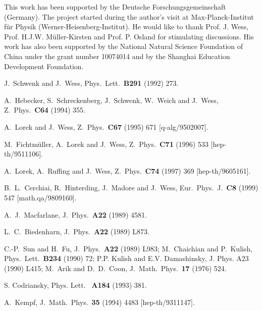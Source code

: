 \documentclass[a4paper,12pt]{article}
\begin{document}
\vspace{0.4cm}
  This work has been supported by the Deutsche Forschungsgemeinschaft 
(Germany). The project started during the author's visit at 
Max-Planck-Institut f\"ur Physik (Werner-Heisenberg-Institut).
 He would like to thank Prof. J. Wess, Prof. H.J.W. M\"uller-Kirsten
 and Prof. P. Osland for stimulating discussions.
 His work has also been supported by the National Natural Science 
Foundation of China under the grant number 10074014 and by the Shanghai 
Education Development Foundation. 

\begin{thebibliography}{99}

J.~Schwenk and J.~Wess,
Phys.\ Lett.\ {\bf B291} (1992) 273.

A.~Hebecker, S.~Schreckenberg, J.~Schwenk, W.~Weich and J.~Wess,
Z.\ Phys.\ {\bf C64} (1994) 355.

A.~Lorek and J.~Wess,
Z.\ Phys.\ {\bf C67} (1995) 671
[q-alg/9502007].

M.~Fichtm\"uller, A.~Lorek and J.~Wess,
Z.\ Phys.\ {\bf C71} (1996) 533
[hep-th/9511106].

A.~Lorek, A.~Ruffing and J.~Wess,
Z.\ Phys.\ {\bf C74} (1997) 369
[hep-th/9605161].

B.~L.~Cerchiai, R.~Hinterding, J.~Madore and J.~Wess,
Eur.\ Phys.\ J.\ {\bf C8} (1999) 547
[math.qa/9809160].


A.~J.~Macfarlane,
J.\ Phys.\ {\bf A22} (1989) 4581.

L.~C.~Biedenharn,
J.\ Phys.\ {\bf A22} (1989) L873.

C.-P.~Sun and H.~Fu,
J.\ Phys.\ {\bf A22} (1989) L983;
%
M.~Chaichian and P.~Kulish,
Phys.\ Lett.\ {\bf B234} (1990) 72;
%
P.P. Kulish and E.V. Damashinsky, J. Phys. A23 (1990) L415; 
%
M.~Arik and D.~D.~Coon,
J.\ Math.\ Phys.\ {\bf 17} (1976) 524.

S. Codriansky, Phys. Lett. \ {\bf A184} (1993) 381.

A.~Kempf,
J.\ Math.\ Phys.\ {\bf 35} (1994) 4483
[hep-th/9311147].


\end{thebibliography}
\end{document}
